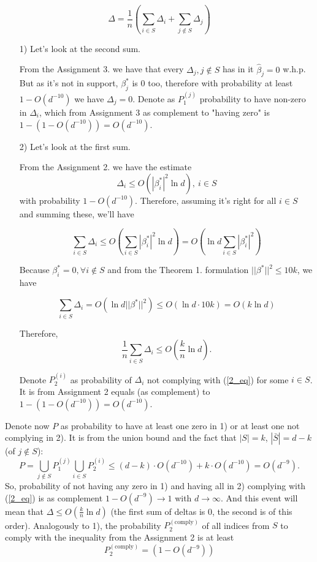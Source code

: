 \documentclass[]{article}
\begin{document}
$$\Delta = \frac{1}{n}\left(\sum_{i\in S} \Delta_i + 
\sum_{j\notin S} \Delta_j\right)
$$
\begin{enumerate}
	\item[1)] Let's look at the second sum.

From the Assignment 3. we have that every $\Delta_j, j\notin S$ has in it $\hat{\beta}_j=0$ w.h.p. But as it's not in support, $\beta_j^*$ is $0$ too, therefore with probability at least $1-O(d^{-10})$ we have $\Delta_j=0$.
Denote as $P_1^{(j)}$ probability to have non-zero in $\Delta_i$, which from Assignment 3 as complement to "having zero" is $1-(1-O(d^{-10}))=O(d^{-10})$. 

\item[2)] Let's look at the first sum.

From the Assignment 2. we have the estimate 
\begin{equation}
\Delta_i \le O(|\beta_i^*|^2\ln d), \: i\in S
\label{2_eq}
\end{equation} with probability $1 - O(d^{-10})$. Therefore, assuming it's right for all $i\in S$ and summing these, we'll have 

$$\sum_{i\in S} \Delta_i \le O\left(\sum_{i\in S} |\beta_i^*|^2 \ln d\right)=
O\left(\ln d \sum_{i\in S} |\beta_i^*|^2\right)$$

Because $\beta_i^*=0, \forall i\notin S$ and from the Theorem 1. formulation $||\beta^*||^2\le 10k$, we have

$$\sum_{i\in S} \Delta_i = 
O(\ln d||\beta^*||^2) \le
O(\ln d\cdot 10 k) = O(k\ln d)$$ 

Therefore,
$$\frac{1}{n}\sum_{i\in S} \Delta_i \le 
O\left(\frac{k}{n}\ln d\right).$$

Denote $P_2^{(i)}$ as probability of $\Delta_i$ not complying with (\ref{2_eq}) for some $i\in S$. It is from Assignment 2 equals (as complement) to $1-(1-O(d^{-10}))=O(d^{-10})$.
\end{enumerate} 
Denote now $P$ as probability to have at least one zero in 1) or at least one not complying in 2). It is from the union bound and the fact that $|S| = k$, $|\bar{S}| = d - k$ (of $j\notin S$):
\begin{equation}
P=\bigcup_{j\notin S}P_1^{(j)}\bigcup_{i\in S}P_2^{(i)} \le (d-k)\cdot O(d^{-10}) + k \cdot O(d^{-10}) = O(d^{-9}).
\end{equation}
So, probability of not having any zero in 1) and having all in 2) complying with (\ref{2_eq}) is as complement $1-O(d^{-9})\rightarrow 1$ with $d\rightarrow \infty$. And this event will mean that $\Delta\le O(\frac{k}{n}\ln{d})$ (the first sum of deltas is $0$, the second is of this order).
Analogously to 1), the probability $P_2^{(\text{comply})}$ of all indices from $S$ to comply with the inequality from the Assignment 2 is at least \begin{equation}
P_2^{(\text{comply})} = (1-O(d^{-9}))
\end{equation}
\end{document}
